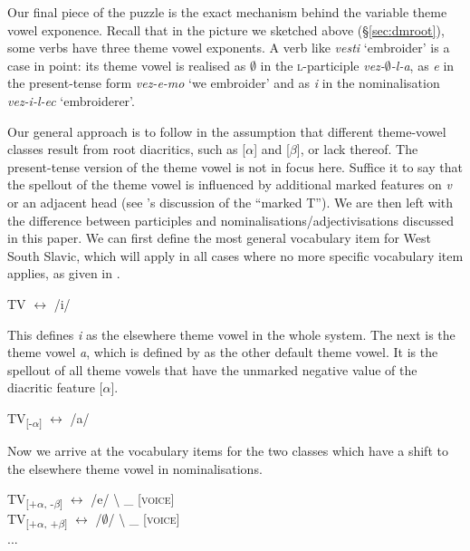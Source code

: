 \documentclass[output=paper,colorlinks,citecolor=brown]{langscibook}
\begin{document}
Our final piece of the puzzle is the exact mechanism behind the variable theme vowel exponence. Recall that in the picture we sketched above (\S \ref{sec:dmroot}), some verbs have three theme vowel exponents.  A verb like \textit{vesti} `embroider' is a case in point: its theme vowel is realised as $\emptyset$ in the \textsc{l}-participle \textit{vez-$\emptyset$-l-a}, as \textit{e} in the present-tense form \textit{vez-e-mo} `we embroider' and as \textit{i} in the nominalisation \textit{vez-i-l-ec} `embroiderer'. 

Our general approach is to follow \citet[]{oltra1999notion} in the assumption that different theme-vowel classes result from root diacritics, such as [$\alpha$] and [$\beta$], or lack thereof. The present-tense version of the theme vowel is not in focus here. Suffice it to say that the spellout of the theme vowel is influenced by additional marked features on \textit{v} or an adjacent head (see \citeauthor{oltra1999notion}'s discussion of the ``marked T''). We are then left with the difference between participles and nominalisations/adjectivisations discussed in this paper. We can first define the most general vocabulary item for West South Slavic, which will apply in all cases where no more specific vocabulary item applies, as given in .


\ea \label{ex:VII}
       TV $\leftrightarrow$ /i/    
\z 

\noindent This defines \textit{i} as the elsewhere theme vowel in the whole system. The next is the theme vowel \textit{a}, which is defined by \citet{marvin2002} as the other default theme vowel. It is the spellout of all theme vowels that have the unmarked negative value of the diacritic feature [$\alpha$].

\ea \label{ex:VIA}
       TV\textsubscript{[-$\alpha$]}  $\leftrightarrow$   /a/
\z 

\noindent Now we arrive at the vocabulary items for the two classes which have a shift to the elsewhere theme vowel in nominalisations.

\ea 
\label{ex:VIrest}
       
         TV\textsubscript{[+$\alpha$, -$\beta$]}  $\leftrightarrow$    /e/ \textbackslash \hspace{0.3cm} \_ \textsc{[voice]}\\
         TV\textsubscript{[+$\alpha$, +$\beta$]} $\leftrightarrow$ /$\emptyset$/    \textbackslash \hspace{0.3cm} \_ \textsc{[voice]} \\
        ...
   
\end{document}
